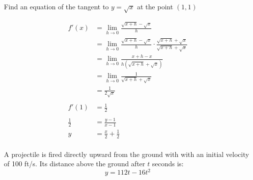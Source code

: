 \documentclass[letterpaper]{exam}
\begin{document}
\begin{questions}
      \question[10] Find an equation of the tangent to $y = \sqrt{x}$ at the point $(1, 1)$
      \begin{solution}
        \begin{align*}
          f'(x) & = \lim_{h \to 0} \frac{\sqrt{x + h} - \sqrt{x}}{h} \\
                & = \lim_{h \to 0} \frac{\sqrt{x + h} - \sqrt{x}}{h} \cdot \frac{\sqrt{x + h} + \sqrt{x}}{\sqrt{x + h} + \sqrt{x}} \\
                & = \lim_{h \to 0} \frac{x + h - x}{h \left( \sqrt{x + h} + \sqrt{x} \right)} \\
                & = \lim_{h \to 0} \frac{1}{ \sqrt{x + h} + \sqrt{x} } \\
                & = \frac{1}{2 \sqrt{x}} \\
          \\
          f'(1) &= \frac{1}{2} \\
          \\
          \frac{1}{2} & = \frac{y - 1}{x - 1} \\
          y           & = \boxed{ \frac{x}{2} + \frac{1}{2} } \\
        \end{align*}
      \end{solution}

      \question
      A projectile is fired directly upward from the ground with with an initial velocity
      of 100 ft/s. Its distance above the ground after $t$ seconds is:
      \[
        y = 112t - 16t^2
      \]


  \end{questions}
\end{document}
